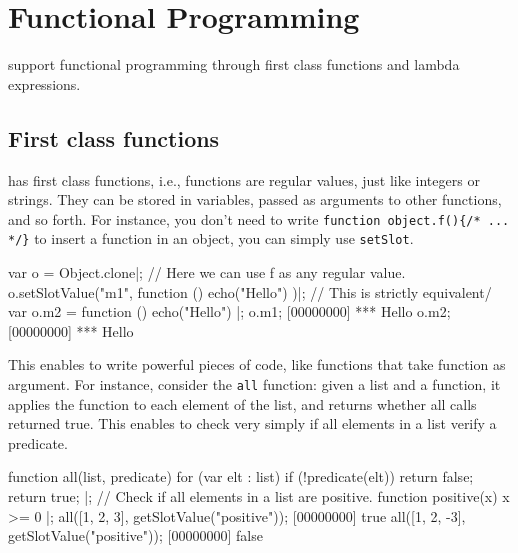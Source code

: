 
\chapter{Functional Programming}
\label{sec:tut:functional}

\us support functional programming through first class functions and
lambda expressions.

\section{First class functions}

\us has first class functions, i.e., functions are regular values,
just like integers or strings. They can be stored in variables,  passed
as arguments to other functions, and so forth. For instance, you don't need
to write
\lstinline|function object.f(){/* ... */}| to insert a function in an
object, you can simply use \lstinline{setSlot}.

\begin{urbiscript}[firstnumber=1]
var o = Object.clone|;
// Here we can use f as any regular value.
o.setSlotValue("m1", function () { echo("Hello") })|;
// This is strictly equivalent/
var o.m2 = function () { echo("Hello") }|;
o.m1;
[00000000] *** Hello
o.m2;
[00000000] *** Hello
\end{urbiscript}

This enables to write powerful pieces of code, like functions that
take function as argument. For instance, consider the \lstinline{all}
function: given a list and a function, it applies the function to each
element of the list, and returns whether all calls returned true. This
enables to check very simply if all elements in a list verify a
predicate.

\begin{urbiscript}
function all(list, predicate)
{
  for (var elt : list)
    if (!predicate(elt))
      return false;
  return true;
}|;
// Check if all elements in a list are positive.
function positive(x) { x >= 0 }|;
all([1, 2, 3], getSlotValue("positive"));
[00000000] true
all([1, 2, -3], getSlotValue("positive"));
[00000000] false
\end{urbiscript}

